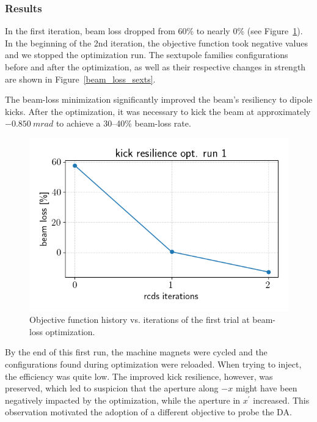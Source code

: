 \documentclass[a4paper,11pt]{article}
\begin{document}
\subsubsection{Results}
In the first iteration, beam loss dropped from 60\% to nearly 0\% (see Figure~\ref{beam_loss_hist}). In the beginning of the 2nd iteration, the objective function took negative values and we stopped the optimization run. The sextupole families configurations before and after the optimization, as well as their respective changes in strength are shown in Figure~\ref{beam_loss_sexts}. 

The beam-loss minimization significantly improved the beam's resiliency to dipole kicks. After the optimization, it was necessary to kick the beam at approximately $-0.850~\unit{m rad}$ to achieve a  30--40\% beam-loss rate.
\begin{figure}
    \centering
    \includegraphics[scale=0.7]{beam_loss_hist_run1.png}
    \caption{Objective function history vs. iterations of the first trial at beam-loss optimization.}
    \label{beam_loss_hist}
\end{figure}
By the end of this first run, the machine magnets were cycled and the configurations found during optimization were reloaded. When trying to inject, the efficiency was quite low. The improved kick resilience, however, was preserved, which led to suspicion that the aperture along $-x$ might have been negatively impacted by the optimization, while the aperture in $x^\prime$ increased. This observation motivated the adoption of a different objective to probe the DA.
\end{document}
